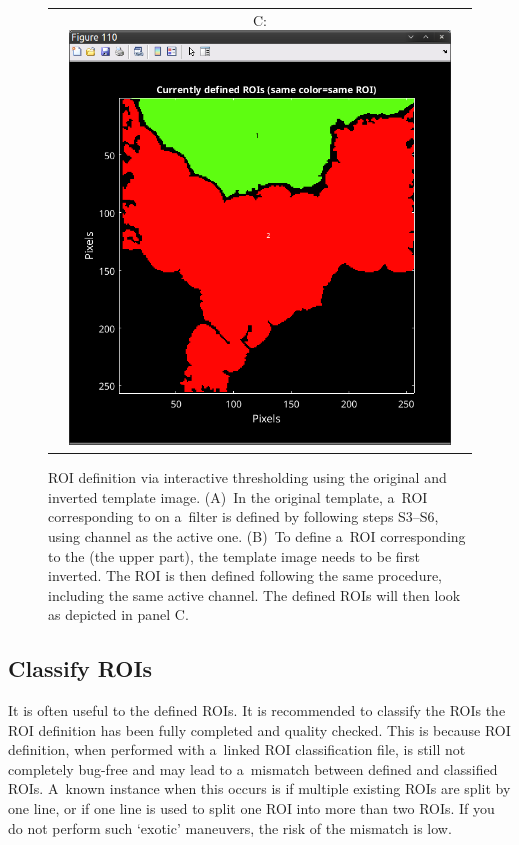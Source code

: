 \begin{figure}[!ht]
\begin{tabular}{ccc}
&
C: \includegraphics[scale=0.19]{figs3/LANS-roi-interactive8}
\end{tabular}
\caption{\label{fig:interactive-invert}%
ROI definition via interactive thresholding using the original and inverted template image. (A)~In the original template, a~ROI corresponding to  on a~filter is defined by following steps S3--S6, using  channel as the active one. (B)~To define a~ROI corresponding to the  (the upper part), the template image needs to be first inverted. The ROI is then defined following the same procedure, including the same active channel. The defined ROIs will then look as depicted in panel C.}
\end{figure}


\subsection{Classify ROIs}

\goldbox{}
It is often useful to  the defined ROIs. It is recommended to classify the ROIs  the ROI definition has been fully completed and quality checked. This is because ROI definition, when performed with a~linked ROI classification file, is still not completely bug-free and may lead to a~mismatch between defined and classified ROIs. A~known instance when this occurs is if multiple existing ROIs are split by one line, or if one line is used to split one ROI into more than two ROIs. If you do not perform such `exotic' maneuvers, the risk of the mismatch is low.
\tcbe

